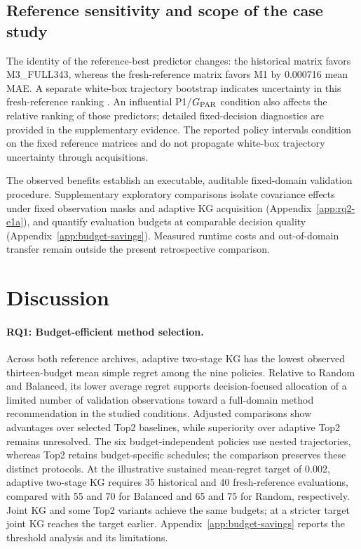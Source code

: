 \documentclass[10pt,a4paper]{article}
\begin{document}
\subsection{Reference sensitivity and scope of the case study}
The identity of the reference-best predictor changes: the historical matrix favors M3\_FULL343, whereas the fresh-reference matrix favors M1 by 0.000716 mean MAE. A separate white-box trajectory bootstrap indicates uncertainty in this fresh-reference ranking \cite{praiseB0001}. An influential P1/$G_{\rm PAR}$ condition also affects the relative ranking of those predictors; detailed fixed-decision diagnostics are provided in the supplementary evidence. The reported policy intervals condition on the fixed reference matrices and do not propagate white-box trajectory uncertainty through acquisitions.

The observed benefits establish an executable, auditable fixed-domain validation procedure. Supplementary exploratory comparisons isolate covariance effects under fixed observation masks and adaptive KG acquisition (Appendix~\ref{app:rq2-e1a}), and quantify evaluation budgets at comparable decision quality (Appendix~\ref{app:budget-savings}). Measured runtime costs and out-of-domain transfer remain outside the present retrospective comparison.

\FloatBarrier
\section{Discussion}
\paragraph{RQ1: Budget-efficient method selection.}
Across both reference archives, adaptive two-stage KG has the lowest observed thirteen-budget mean simple regret among the nine policies. Relative to Random and Balanced, its lower average regret supports decision-focused allocation of a limited number of validation observations toward a full-domain method recommendation in the studied conditions. Adjusted comparisons show advantages over selected Top2 baselines, while superiority over adaptive Top2 remains unresolved. The six budget-independent policies use nested trajectories, whereas Top2 retains budget-specific schedules; the comparison preserves these distinct protocols. At the illustrative sustained mean-regret target of 0.002, adaptive two-stage KG requires 35 historical and 40 fresh-reference evaluations, compared with 55 and 70 for Balanced and 65 and 75 for Random, respectively. Joint KG and some Top2 variants achieve the same budgets; at a stricter target joint KG reaches the target earlier. Appendix~\ref{app:budget-savings} reports the threshold analysis and its limitations.
\end{document}
